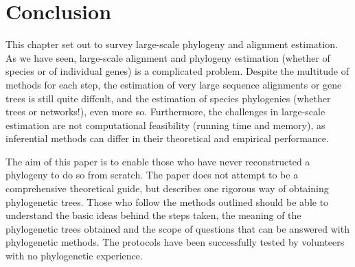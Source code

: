 \chapter*{Conclusion}
This chapter set out to survey large-scale phylogeny and alignment estimation. 
As we have seen, large-scale alignment and phylogeny estimation 
(whether of species or of individual genes) is a complicated problem. 
Despite the multitude of methods for each step, the estimation of very 
large sequence alignments or gene trees is still quite diffcult, 
and the estimation of species phylogenies (whether trees or networks!), 
even more so. Furthermore, the challenges in large-scale estimation 
are not computational feasibility (running time and memory), as 
inferential methods can differ in their theoretical and empirical 
performance. 

The aim of this paper is to enable those who have never reconstructed a phylogeny to do so from scratch. The
paper does not attempt to be a comprehensive theoretical guide, but describes one rigorous way of obtaining
phylogenetic trees. Those who follow the methods outlined should be able to understand the basic ideas
behind the steps taken, the meaning of the phylogenetic trees obtained and the scope of questions that can be
answered with phylogenetic methods. The protocols have been successfully tested by volunteers with no
phylogenetic experience.
\newpage